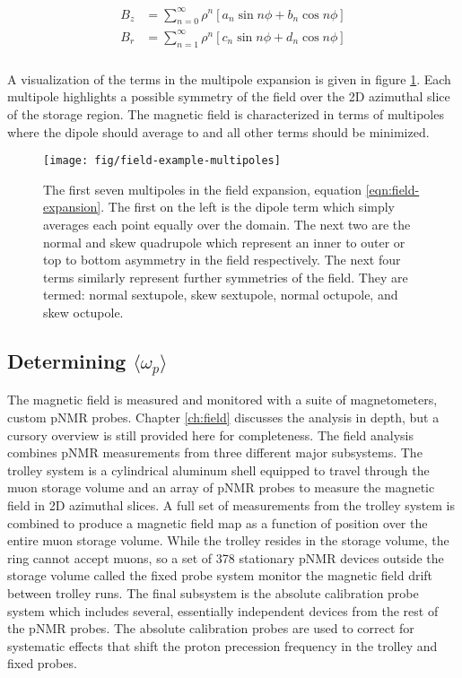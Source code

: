 \begin{align}
\label{eqn:field-expansion}
\begin{split}
B_z & = \sum_{n=0}^{\infty} \rho^n[a_n \sin{n\phi} + b_n \cos{n\phi}] \\
B_r & = \sum_{n=1}^{\infty} \rho^n[c_n \sin{n\phi} + d_n \cos{n\phi}] \\
\end{split}
\end{align}

\noindent
A visualization of the terms in the multipole expansion is given in figure \ref{fig:field-example-multipoles}.  Each multipole highlights a possible symmetry of the field over the 2D azimuthal slice of the storage region. The magnetic field is characterized in terms of multipoles where the dipole should average to \bmagic and all other terms should be minimized.

\begin{figure}
\texttt{[image: fig/field-example-multipoles]}
\caption{The first seven multipoles in the field expansion, equation \ref{eqn:field-expansion}.  The first on the left is the dipole term which simply averages each point equally over the domain.  The next two are the normal and skew quadrupole which represent an inner to outer or top to bottom asymmetry in the field respectively.  The next four terms similarly represent further symmetries of the field.  They are termed: normal sextupole, skew sextupole, normal octupole, and skew octupole. \label{fig:field-example-multipoles}}
\end{figure}

\subsection{Determining $\langle \omega_p \rangle$}

The magnetic field is measured and monitored with a suite of magnetometers, custom pNMR probes. Chapter \ref{ch:field} discusses the analysis in depth, but a cursory overview is still provided here for completeness.  The field analysis combines pNMR measurements from three different major subsystems.  The trolley system is a cylindrical aluminum shell equipped to travel through the muon storage volume and an array of pNMR probes to measure the magnetic field in 2D azimuthal slices.  A full set of measurements from the trolley system is combined to produce a magnetic field map as a function of position over the entire muon storage volume.  While the trolley resides in the storage volume, the ring cannot accept muons, so a set of 378 stationary pNMR devices outside the storage volume called the fixed probe system monitor the magnetic field drift between trolley runs.  The final subsystem is the absolute calibration probe system which includes several, essentially independent devices from the rest of the pNMR probes.  The absolute calibration probes are used to correct for systematic effects that shift the proton precession frequency in the trolley and fixed probes.

